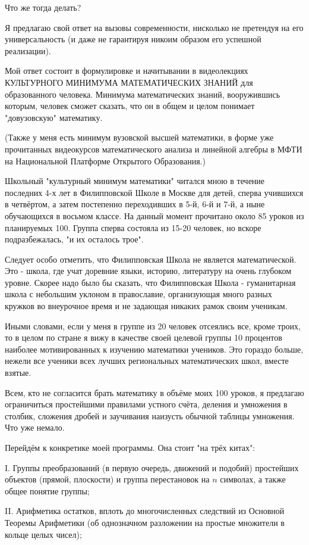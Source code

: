 Что же тогда делать?

Я предлагаю свой ответ на вызовы современности, нисколько не претендуя на его
универсальность (и даже не гарантируя никоим образом его успешной реализации).

Мой ответ состоит в формулировке и начитывании в видеолекциях КУЛЬТУРНОГО
МИНИМУМА МАТЕМАТИЧЕСКИХ ЗНАНИЙ для образованного человека. Минимума
математических знаний, вооружившись которым, человек сможет сказать, что он в 
общем и целом понимает "довузовскую" математику. 

(Также у меня есть минимум вузовской высшей математики, в форме уже прочитанных 
видеокурсов математического анализа и линейной алгебры в МФТИ на Национальной 
Платформе Открытого Образования.)

Школьный "культурный минимум математики" читался мною в течение последних 
4-х лет в Филипповской Школе в Москве для детей, сперва учившихся в четвёртом,
а затем постепенно переходивших в 5-й, 6-й и 7-й, а ныне обучающихся в восьмом
классе. На данный момент прочитано около 85 уроков из планируемых 100. Группа
сперва состояла из 15-20 человек, но вскоре подразбежалась, "и их осталось трое".

Следует особо отметить, что Филипповская Школа не является математической.
Это - школа, где учат доревние языки, историю, литературу на очень глубоком
уровне. Скорее надо было бы сказать, что Филипповская Школа - гуманитарная
школа с небольшим уклоном в православие, организующая много разных кружков
во внеурочное время и не задающая никаких рамок своим ученикам.

Иными словами, если у меня в группе из 20 человек отсеялись все, кроме троих, то
в целом по стране я вижу в качестве своей целевой группы 10 процентов наиболее
мотивированных к изучению математики учеников. Это гораздо больше, нежели 
все ученики всех лучших региональных математических школ, вместе взятые.

Всем, кто не согласится брать математику в объёме моих 100 уроков, я предлагаю
ограничиться простейшими правилами устного счёта, деления и умножения в столбик,
сложения дробей и заучивания наизусть обычной таблицы умножения. Что уже немало.

Перейдём к конкретике моей программы. Она стоит "на трёх китах":

I. Группы преобразований (в первую очередь, движений и подобий) простейших объектов
(прямой, плоскости) и группа перестановок на $n$ символах, а также общее понятие группы;

II. Арифметика остатков, вплоть до многочисленных следствий из Основной Теоремы
Арифметики (об однозначном разложении на простые множители в кольце целых чисел);

